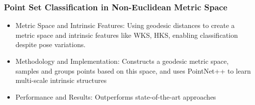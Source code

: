 \documentclass[11pt,xcolor={dvipsnames},hyperref={pdftex,pdfpagemode=UseNone,hidelinks,pdfdisplaydoctitle=true},usepdftitle=false]{beamer}
\begin{document}

\begin{frame}
\frametitle{Point Set Classification in Non-Euclidean Metric Space}
\begin{itemize}
    \item Metric Space and Intrinsic Features: Using geodesic distances to create a metric space and intrinsic features like WKS, HKS, enabling classification despite pose variations.

    \item Methodology and Implementation: Constructs a geodesic metric space, samples and groups points based on this space, and uses PointNet++ to learn multi-scale intrinsic structures
  
    \item Performance and Results: Outperforms state-of-the-art approaches
\end{itemize}
\end{frame}
\end{document}
